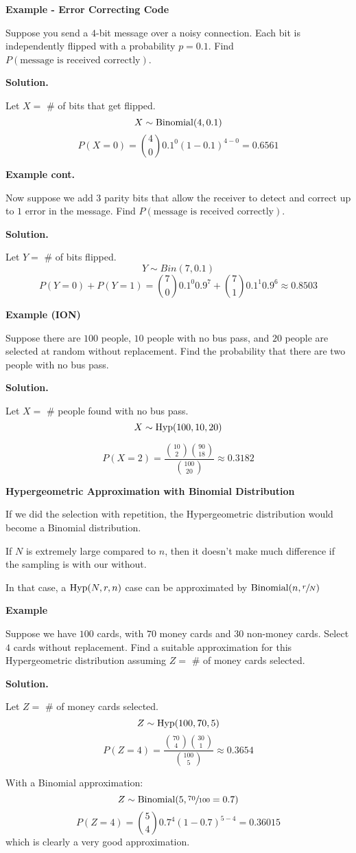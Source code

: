 \textbf{Example - Error Correcting Code}

Suppose you send a $ 4 $-bit message over a noisy connection.
Each bit is independently flipped with a probability $ p=0.1 $. Find
$ P(\text{message is received correctly}) $.

\textbf{Solution.}

Let $ X= $ \# of bits that get flipped.
\[ X \sim \operatorname{Binomial}(4,0.1) \]
\[ P(X=0)=\binom{4}{0}0.1^0(1-0.1)^{4-0}=0.6561 \]

\textbf{Example cont.}

Now suppose we add $ 3 $ parity bits that allow the receiver
to detect and correct up to $ 1 $ error in the message. Find
$ P(\text{message is received correctly}) $.

\textbf{Solution.}

Let $ Y= $ \# of bits flipped.
\[ Y \sim Bin(7,0.1) \]
\[P(Y=0)+P(Y=1)= \binom{7}{0}0.1^0 0.9^7 + \binom{7}{1}0.1^1 0.9^6\approx 0.8503 \]

\textbf{Example (ION)}

Suppose there are $ 100 $ people, $ 10 $ people with no bus pass,
and $ 20 $ people are selected at random without replacement.
Find the probability that there are two people with no bus pass.

\textbf{Solution.}

Let $ X= $ \# people found with no bus pass.
\[ X \sim \operatorname{Hyp}(100,10,20) \]

\[ P(X=2)=\frac{\binom{10}{2}\binom{90}{18}}{\binom{100}{20}}\approx 0.3182 \]

\textbf{Hypergeometric Approximation with Binomial Distribution}

If we did the selection with repetition, the Hypergeometric distribution
would become a Binomial distribution.

If $ N $ is extremely large compared to $ n $, then it doesn't make much difference
if the sampling is with our without.

In that case, a $ \operatorname{Hyp}(N,r,n) $ case can be approximated by $ \operatorname{Binomial}(n,\sfrac{r}{N}) $

\textbf{Example}

Suppose we have $ 100 $ cards, with $ 70 $ money cards and $ 30 $ non-money cards.
Select $ 4 $ cards without replacement.
Find a suitable approximation for this Hypergeometric distribution assuming
$ Z= $ \# of money cards selected.

\textbf{Solution.}

Let $ Z= $ \# of money cards selected.
\[ Z \sim \operatorname{Hyp}(100,70,5) \]
\[ P(Z=4)=\frac{\binom{70}{4}\binom{30}{1}}{\binom{100}{5}}\approx 0.3654 \]

With a Binomial approximation:
\[ Z \sim \operatorname{Binomial}(5,\sfrac{70}{100}=0.7) \]
\[ P(Z=4)=\binom{5}{4}0.7^4(1-0.7)^{5-4}= 0.36015 \]
which is clearly a very good approximation.
